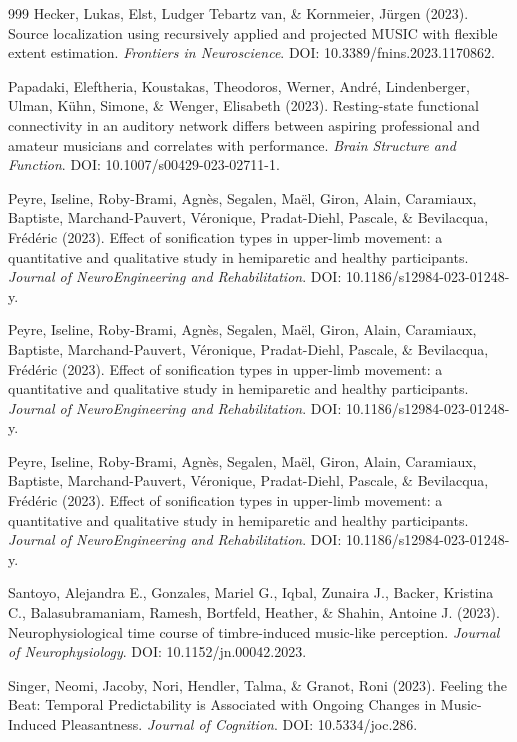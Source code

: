 \documentclass[9pt,onecolumn]{article}
\begin{document}
\begin{thebibliography}{999}
Hecker, Lukas, Elst, Ludger Tebartz van, \& Kornmeier, Jürgen (2023). Source localization using recursively applied and projected MUSIC with flexible extent estimation. \textit{Frontiers in Neuroscience}. DOI: 10.3389/fnins.2023.1170862.

Papadaki, Eleftheria, Koustakas, Theodoros, Werner, André, Lindenberger, Ulman, Kühn, Simone, \& Wenger, Elisabeth (2023). Resting-state functional connectivity in an auditory network differs between aspiring professional and amateur musicians and correlates with performance. \textit{Brain Structure and Function}. DOI: 10.1007/s00429-023-02711-1.

Peyre, Iseline, Roby-Brami, Agnès, Segalen, Maël, Giron, Alain, Caramiaux, Baptiste, Marchand-Pauvert, Véronique, Pradat-Diehl, Pascale, \& Bevilacqua, Frédéric (2023). Effect of sonification types in upper-limb movement: a quantitative and qualitative study in hemiparetic and healthy participants. \textit{Journal of NeuroEngineering and Rehabilitation}. DOI: 10.1186/s12984-023-01248-y.

Peyre, Iseline, Roby-Brami, Agnès, Segalen, Maël, Giron, Alain, Caramiaux, Baptiste, Marchand-Pauvert, Véronique, Pradat-Diehl, Pascale, \& Bevilacqua, Frédéric (2023). Effect of sonification types in upper-limb movement: a quantitative and qualitative study in hemiparetic and healthy participants. \textit{Journal of NeuroEngineering and Rehabilitation}. DOI: 10.1186/s12984-023-01248-y.

Peyre, Iseline, Roby-Brami, Agnès, Segalen, Maël, Giron, Alain, Caramiaux, Baptiste, Marchand-Pauvert, Véronique, Pradat-Diehl, Pascale, \& Bevilacqua, Frédéric (2023). Effect of sonification types in upper-limb movement: a quantitative and qualitative study in hemiparetic and healthy participants. \textit{Journal of NeuroEngineering and Rehabilitation}. DOI: 10.1186/s12984-023-01248-y.

Santoyo, Alejandra E., Gonzales, Mariel G., Iqbal, Zunaira J., Backer, Kristina C., Balasubramaniam, Ramesh, Bortfeld, Heather, \& Shahin, Antoine J. (2023). Neurophysiological time course of timbre-induced music-like perception. \textit{Journal of Neurophysiology}. DOI: 10.1152/jn.00042.2023.

Singer, Neomi, Jacoby, Nori, Hendler, Talma, \& Granot, Roni (2023). Feeling the Beat: Temporal Predictability is Associated with Ongoing Changes in Music-Induced Pleasantness. \textit{Journal of Cognition}. DOI: 10.5334/joc.286.


\end{thebibliography}
\end{document}
